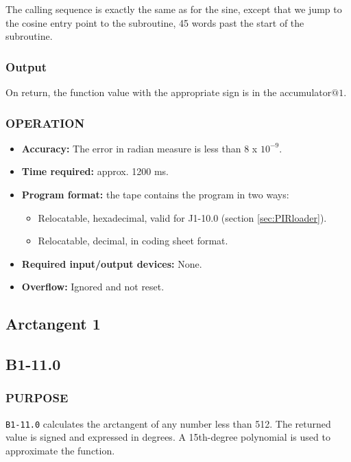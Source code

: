 \documentclass{article}
\begin{document}
The calling sequence is exactly the same as for the sine, except that we jump to the cosine entry point to the subroutine, 45 words past the start of the subroutine.

\subsubsection*{Output}
On return, the function value with the appropriate sign is in the accumulator$@1$.

\subsubsection*{OPERATION}
\begin{itemize}
    \item \textbf{Accuracy:} The error in radian measure is less than 8 x $10^{-9}$.
    \item \textbf{Time required:} approx. 1200 ms.
    \item \textbf{Program format:} the tape contains the program in two ways:
    \begin{itemize}
      \item Relocatable, hexadecimal, valid for J1-10.0 (section \ref{sec:PIRloader}).
        \item Relocatable, decimal, in coding sheet format.
    \end{itemize}
    \item \textbf{Required input/output devices:} None.
    \item \textbf{Overflow:} Ignored and not reset.
\end{itemize}

\newpage

\subsection{Arctangent 1}
\label{sec:arctangent_1}
\subsection*{B1-11.0}

\subsubsection*{PURPOSE}
\texttt{B1-11.0} calculates the arctangent of any number less than 512. The returned value is signed and expressed in degrees. A 15th-degree polynomial is used to approximate the function.
\end{document}
